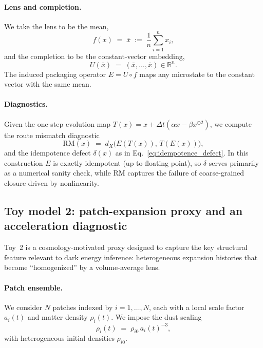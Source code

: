 \documentclass[11pt]{article}
\newcommand{\StateSpace}{X}
\newcommand{\Lens}{f}              \newcommand{\Completion}{U}        \newcommand{\PackageOp}{E}
\newcommand{\RM}{\mathrm{RM}}      \newcommand{\iddef}{\delta}
\theoremstyle{definition}
\theoremstyle{plain}
\theoremstyle{remark}
\begin{document}
\paragraph{Lens and completion.}
We take the lens to be the mean,
\begin{equation}
\Lens(x) \;=\; \bar{x} \;:=\; \frac{1}{n}\sum_{i=1}^n x_i,
\label{eq:toy1_lens_mean}
\end{equation}
and the completion to be the constant-vector embedding,
\begin{equation}
\Completion(\bar{x}) \;=\; (\bar{x},\ldots,\bar{x}) \in \mathbb{R}^n.
\label{eq:toy1_completion_const}
\end{equation}
The induced packaging operator $\PackageOp=\Completion\circ\Lens$ maps any microstate to the constant vector with the same mean.

\paragraph{Diagnostics.}
Given the one-step evolution map $T(x)=x+\Delta t(\alpha x-\beta x^{\odot 2})$, we compute the route mismatch diagnostic
\begin{equation}
\RM(x) \;=\; d_{\StateSpace}\!\big(\PackageOp(T(x)),\,T(\PackageOp(x))\big),
\label{eq:toy1_rm}
\end{equation}
and the idempotence defect $\iddef(x)$ as in Eq.~\eqref{eq:idempotence_defect}.
In this construction $\PackageOp$ is exactly idempotent (up to floating point), so $\iddef$ serves primarily as a numerical sanity check, while $\RM$ captures the failure of coarse-grained closure driven by nonlinearity.

\subsection{Toy model 2: patch-expansion proxy and an acceleration diagnostic}\label{sec:methods:toy2}
Toy~2 is a cosmology-motivated proxy designed to capture the key structural feature relevant to dark energy inference: heterogeneous expansion histories that become ``homogenized'' by a volume-average lens.

\paragraph{Patch ensemble.}
We consider $N$ patches indexed by $i=1,\ldots,N$, each with a local scale factor $a_i(t)$ and matter density $\rho_i(t)$.
We impose the dust scaling
\begin{equation}
\rho_i(t) \;=\; \rho_{i0}\,a_i(t)^{-3},
\label{eq:toy2_rho_scaling}
\end{equation}
with heterogeneous initial densities $\rho_{i0}$.
\end{document}

